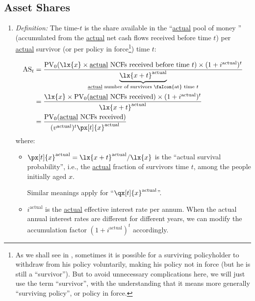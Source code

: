 \subsection{Asset Shares}
\begin{enumerate}
\item \emph{Definition:} The time-\(t\)  is the share
 available in the ``\underline{actual} pool of money
'' (accumulated from the \underline{actual} net cash flows
received before time \(t\)) per \underline{actual} survivor (or per policy in
force\footnote{As we shall see in , sometimes it
is possible for a surviving policyholder to withdraw from his policy
voluntarily, making his policy not in force (but he is still a ``survivor'').
But to avoid unnecessary complications here, we will just use the term
``survivor'', with the understanding that it means more generally ``surviving
policy'', or policy in force.})  time \(t\):

\begin{align*}
\as_{t}&=\frac{\pvt{0}{\lx{x}\times \text{\underline{actual} NCFs received before time \(t\)}}\times (1+i^{\mathrm{actual}})^{t}}
{\underbrace{\lx{x+t}^{\mathrm{actual}}}_{\text{\underline{actual} number of survivors \faIcon{at} time \(t\)}}}\\
&=\frac{\lx{x}\times \pvt{0}{\text{\underline{actual} NCFs received}}\times (1+i^{\mathrm{actual}})^{t}}{\lx{x+t}^{\mathrm{actual}}} \\
&=\frac{\pvt{0}{\text{\underline{actual} NCFs received}}}{(v^{\mathrm{actual}})^{t}\px[t]{x}^{\mathrm{actual}}}
\end{align*}
where:
\begin{itemize}
\item \(\px[t]{x}^{\mathrm{actual}}=\lx{x+t}^{\mathrm{actual}}/\lx{x}\) is the
``actual survival probability'', i.e., the \underline{actual} fraction of
survivors  time \(t\), among the people initially aged \(x\). \begin{note}
Similar meanings apply for ``\(\qx[t]{x}^{\mathrm{actual}}\)''.
\end{note}
\item \(i^{\mathrm{actual}}\) is the \underline{actual} effective interest rate
per annum. When the actual annual interest rates are different for different
years, we can modify the accumulation factor \((1+i^{\mathrm{actual}})^{t}\)
accordingly.
\end{itemize}


\end{enumerate}
